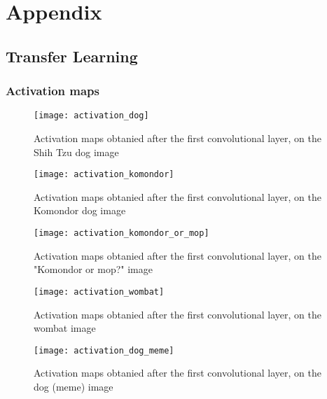 \chapter{Appendix}
\section{Transfer Learning}
\graphicspath{{figs/2a/}}
\subsection{Activation maps} \label{appendix:activation_maps}

\begin{figure}[H]
    \centering
    \texttt{[image: activation\_dog]}
    \caption{Activation maps obtanied after the first convolutional layer, on the Shih Tzu dog image}
    \label{fig:activation_dog}
\end{figure} 

\begin{figure}[H]
    \centering
    \texttt{[image: activation\_komondor]}
    \caption{Activation maps obtanied after the first convolutional layer, on the Komondor dog image}
    \label{fig:activation_komondor}
\end{figure} 

\begin{figure}[H]
    \centering
    \texttt{[image: activation\_komondor\_or\_mop]}
    \caption{Activation maps obtanied after the first convolutional layer, on the "Komondor or mop?" image}
    \label{fig:activation_komondor_or_mop}
\end{figure} 

\begin{figure}[H]
    \centering
    \texttt{[image: activation\_wombat]}
    \caption{Activation maps obtanied after the first convolutional layer, on the wombat image}
    \label{fig:activation_wombat}
\end{figure} 

\begin{figure}[H]
    \centering
    \texttt{[image: activation\_dog\_meme]}
    \caption{Activation maps obtanied after the first convolutional layer, on the dog (meme) image}
    \label{fig:activation_dog_meme}
\end{figure} 
